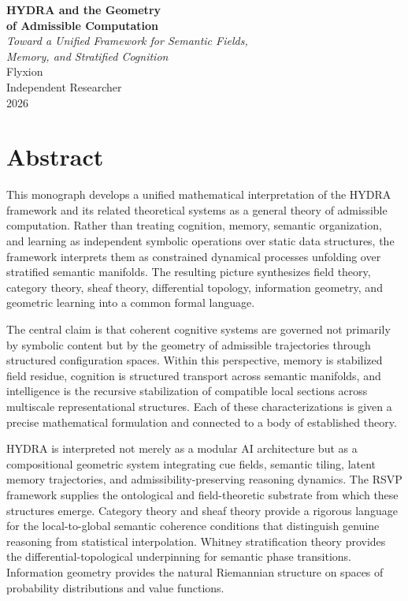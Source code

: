\documentclass[12pt, a4paper, openany]{book}
\theoremstyle{plain}
\theoremstyle{definition}
\theoremstyle{remark}
\begin{document}
\begin{titlepage}
\thispagestyle{empty}
\vspace*{36pt}
{\centering
{\Huge\bfseries HYDRA and the Geometry\\[6pt] of Admissible Computation}\\[20pt]
{\Large\itshape Toward a Unified Framework for Semantic Fields,\\[4pt]
Memory, and Stratified Cognition}\\[52pt]
{\large Flyxion}\\[6pt]
{\normalsize Independent Researcher}\\[54pt]
{\normalsize 2026}
\par}
\end{titlepage}

\chapter*{Abstract}

This monograph develops a unified mathematical interpretation of the HYDRA framework and its related theoretical systems as a general theory of admissible computation. Rather than treating cognition, memory, semantic organization, and learning as independent symbolic operations over static data structures, the framework interprets them as constrained dynamical processes unfolding over stratified semantic manifolds. The resulting picture synthesizes field theory, category theory, sheaf theory, differential topology, information geometry, and geometric learning into a common formal language.

The central claim is that coherent cognitive systems are governed not primarily by symbolic content but by the geometry of admissible trajectories through structured configuration spaces. Within this perspective, memory is stabilized field residue, cognition is structured transport across semantic manifolds, and intelligence is the recursive stabilization of compatible local sections across multiscale representational structures. Each of these characterizations is given a precise mathematical formulation and connected to a body of established theory.

HYDRA is interpreted not merely as a modular AI architecture but as a compositional geometric system integrating cue fields, semantic tiling, latent memory trajectories, and admissibility-preserving reasoning dynamics. The RSVP framework supplies the ontological and field-theoretic substrate from which these structures emerge. Category theory and sheaf theory provide a rigorous language for the local-to-global semantic coherence conditions that distinguish genuine reasoning from statistical interpolation. Whitney stratification theory provides the differential-topological underpinning for semantic phase transitions. Information geometry provides the natural Riemannian structure on spaces of probability distributions and value functions.
\end{document}
